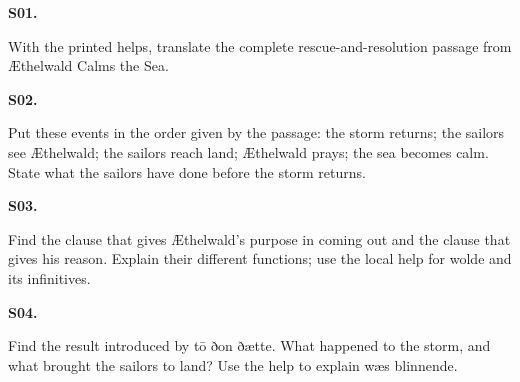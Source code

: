 \par\begin{minipage}{\linewidth}\raggedright
\textbf{S01.}

With the printed helps, translate the complete rescue-and-resolution passage from Æthelwald Calms the Sea.

\end{minipage}\par\addvspace{4pt}

\par\begin{minipage}{\linewidth}\raggedright
\textbf{S02.}

Put these events in the order given by the passage: the storm returns; the sailors see Æthelwald; the sailors reach land; Æthelwald prays; the sea becomes calm. State what the sailors have done before the storm returns.

\end{minipage}\par\addvspace{4pt}

\par\begin{minipage}{\linewidth}\raggedright
\textbf{S03.}

Find the clause that gives Æthelwald’s purpose in coming out and the clause that gives his reason. Explain their different functions; use the local help for wolde and its infinitives.

\end{minipage}\par\addvspace{4pt}

\par\begin{minipage}{\linewidth}\raggedright
\textbf{S04.}

Find the result introduced by tō ðon ðætte. What happened to the storm, and what brought the sailors to land? Use the help to explain wæs blinnende.

\end{minipage}\par\addvspace{4pt}

